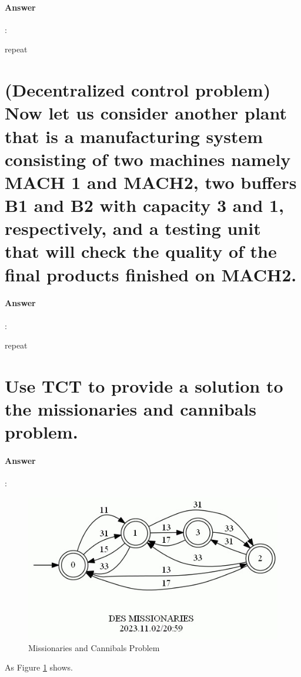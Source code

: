 \documentclass{article}
\begin{document}
\paragraph{Answer}:

repeat

\section{(Decentralized control problem) Now let us consider another plant that is a manufacturing system consisting of two machines namely MACH 1 and MACH2, two buffers B1 and B2 with capacity 3 and 1, respectively, and a testing unit that will check the quality of the final products finished on MACH2.}

\paragraph{Answer}:

repeat

\section{Use TCT to provide a solution to the missionaries and cannibals problem.}

\paragraph{Answer}:

\begin{figure}
  \centering
  \includegraphics{assets/MISSIONARIES.jpg}
  \caption{Missionaries and Cannibals Problem}
  \label{fig:des65}
\end{figure}

As Figure \ref{fig:des65} shows.
\end{document}
